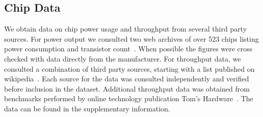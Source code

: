 \documentclass[12pt]{article}
\begin{document}
\subsection{Chip Data}
\label{subsec:chipdata}

We obtain data on chip power usage and throughput from several third party
sources. For power output we consulted two web archives of over 523 chips
listing power consumption and transistor count~\cite{chipsPower1,chipsPower2}.
When possible the figures were cross checked with data directly from the
manufacturer. For throughput data, we consulted a combination of third party
sources, starting with a list published on wikipedia~\cite{wikiMIPS}. Each
source for the data was consulted independently and verified before inclusion
in the dataset. Additional throughput data was obtained from benchmarks
performed by online technology publication Tom's Hardware~\cite{tomsBenchmark}.
The data can be found in the supplementary information.

\newpage



\end{document}
